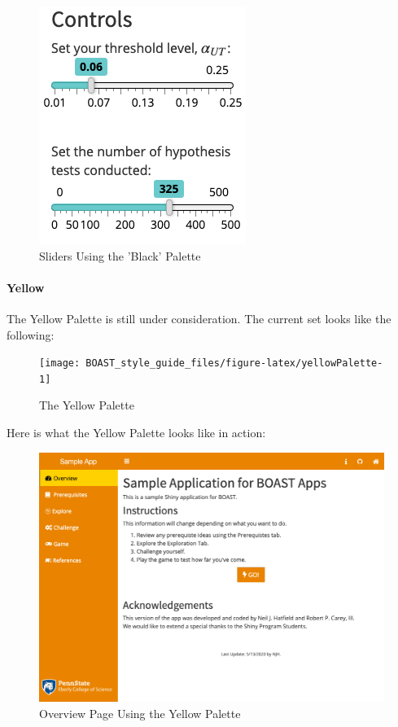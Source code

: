 \documentclass[]{book}
\let\oldparagraph\paragraph
\renewcommand{\paragraph}[1]{\oldparagraph{#1}\mbox{}}
\begin{document}
\begin{figure}

{\centering \includegraphics{images/blackSliders} 

}

\caption{Sliders Using the 'Black' Palette}\label{fig:blackAction3}
\end{figure}

\hypertarget{yellow}{%
\paragraph{Yellow}\label{yellow}}

The Yellow Palette is still under consideration. The current set looks like the following:

\begin{figure}

{\centering \texttt{[image: BOAST\_style\_guide\_files/figure-latex/yellowPalette-1]} 

}

\caption{The Yellow Palette}\label{fig:yellowPalette}
\end{figure}

Here is what the Yellow Palette looks like in action:

\begin{figure}

{\centering \includegraphics[width=14in]{images/yellowOverview} 

}

\caption{Overview Page Using the Yellow Palette}\label{fig:yellowAction1}
\end{figure}
\end{document}

